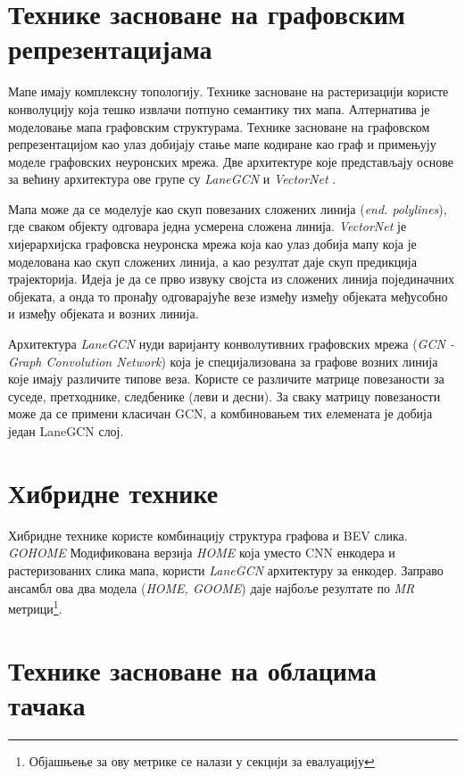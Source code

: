 \documentclass[11pt,oneside]{memoir}
\begin{document}
\section{Технике засноване на графовским репрезентацијама}

Мапе имају комплексну топологију. Технике засноване на растеризацији користе конволуцију која тешко 
извлачи потпуно семантику тих мапа. Алтернатива је моделовање мапа графовским структурама. 
Технике засноване на графовском репрезентацијом као улаз добијају стање мапе кодиране као граф и примењују моделе графовских неуронских мрежа. 
Две архитектуре које представљају основе за већину архитектура ове групе су \textit{LaneGCN} \cite{lanegcn} и \textit{VectorNet} \cite{vectornet}.

Мапа може да се моделује као скуп повезаних сложених линија (\textit{end. polylines}), где сваком објекту одговара једна усмерена сложена линија. 
\textit{VectorNet} је хијерархијска графовска неуронска мрежа која као улаз добија мапу која је моделована као скуп 
сложених линија, а као резултат даје скуп предикција трајекторија. Идеја је да се прво извуку својста из сложених 
линија појединачних објеката, а онда то пронађу одговарајуће везе између између објеката међусобно и између објеката и возних линија. \cite{vectornet} 

Архитектура \textit{LaneGCN} нуди варијанту конволутивних графовских мрежа (\textit{GCN - Graph Convolution Network}) 
која је специјализована за графове возних линија које имају различите типове веза. Користе се различите матрице
повезаности за суседе, претходнике, следбенике (леви и десни). За сваку матрицу повезаности може да се примени класичан GCN, а
комбиновањем тих елемената је добија један LaneGCN слој. \cite{lanegcn} 

\section{Хибридне технике}

Хибридне технике користе комбинацију структура графова и BEV слика. \textit{GOHOME} Модификована верзија \textit{HOME} која уместо
CNN енкодера и растеризованих слика мапа, користи \textit{LaneGCN} архитектуру за енкодер. Заправо ансамбл ова два модела (\textit{HOME, GOOME})
даје најбоље резултате по \textit{MR} метрици\footnote{Објашњење за ову метрике се налази у секцији за евалуацију}.

\section{Технике засноване на облацима тачака}
\end{document}
